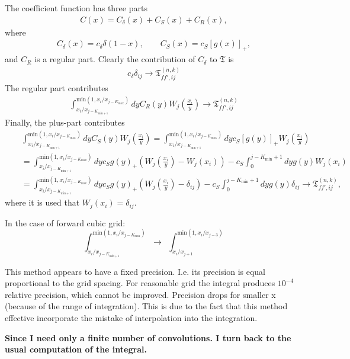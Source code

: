 \documentclass[prd,nofootinbib,eqsecnum,final]{revtex4}
\newcommand{\nn}{\nonumber}
\renewcommand{\(}{\left(}
\renewcommand{\)}{\right)}
\renewcommand{\[}{\left[}
\renewcommand{\]}{\right]}
\newcommand{\red}[1]{{\color[rgb]{1,0,0} #1}}
\begin{document}
The coefficient function has three parts
\begin{eqnarray}
C(x)=C_\delta(x)+C_S(x)+C_R(x),
\end{eqnarray}
where
\begin{eqnarray}
C_\delta(x)=c_\delta \delta(1-x),\qquad
C_S(x)=c_S [g(x)]_+,
\end{eqnarray}
and $C_R$ is a regular part. Clearly the contribution of $C_\delta$ to $\mathfrak{T}$ is
\begin{eqnarray}
c_\delta \delta_{ij} \to \mathfrak{T}_{ff',ij}^{(n,k)}
\end{eqnarray}
The regular part contributes
\begin{eqnarray}
\int^{\text{min}(1,x_i/x_{j-K_{\text{max}}})}_{x_i/x_{j-K_{\text{min}+1}}}dy C_R(y)W_j\(\frac{x_i}{y}\)\to \mathfrak{T}_{ff',ij}^{(n,k)}
\end{eqnarray}
Finally, the plus-part contributes
\begin{eqnarray}
&&\int^{\text{min}(1,x_i/x_{j-K_{\text{max}}})}_{x_i/x_{j-K_{\text{min}+1}}}dy C_S(y)W_j\(\frac{x_i}{y}\)
=\int^{\text{min}(1,x_i/x_{j-K_{\text{max}}})}_{x_i/x_{j-K_{\text{min}+1}}}dy c_S[g(y)]_+W_j\(\frac{x_i}{y}\)
\\\nn
&&=\int^{\text{min}(1,x_i/x_{j-K_{\text{max}}})}_{x_i/x_{j-K_{\text{min}+1}}}dy c_S g(y)_+(W_j\(\frac{x_i}{y}\)-W_j(x_i))-c_S\int_0^{j-K_{\text{min}}+1} dy g(y)W_j(x_i)
\\\nn
&&=\int^{\text{min}(1,x_i/x_{j-K_{\text{max}}})}_{x_i/x_{j-K_{\text{min}+1}}}dy c_S g(y)_+(W_j\(\frac{x_i}{y}\)-\delta_{ij})-c_S\int_0^{j-K_{\text{min}}+1} dy g(y)\delta_{ij}
\to \mathfrak{T}_{ff',ij}^{(n,k)},
\end{eqnarray}
where it is used that $W_j(x_i)=\delta_{ij}$.

\red{In the case of forward cubic grid}:
$$
\int^{\text{min}(1,x_i/x_{j-K_{\text{max}}})}_{x_i/x_{j-K_{\text{min}+1}}} ~~\to~~
\int^{\text{min}(1,x_i/x_{j-3})}_{x_i/x_{j+1}}
$$

\begin{tcolorbox}
This method appears to have a fixed precision. I.e. its precision is equal proportional to the grid spacing. For reasonable grid the integral produces $10^{-4}$ relative precision, which cannot be improved. Precision drops for smaller x (because of the range of integration). This is due to the fact that this method effective incorporate the mistake of interpolation into the integration. 

\textbf{Since I need only a finite number of convolutions. I turn back to the usual computation of the integral.}
\end{tcolorbox}
\end{document}
